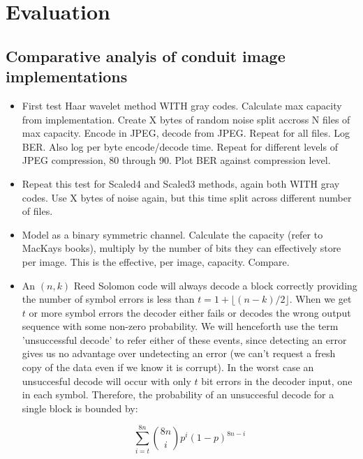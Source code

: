 \chapter{Evaluation}\label{ch:evaluation}

\section{Comparative analyis of conduit image implementations}

\begin{itemize}
\item First test Haar wavelet method WITH gray codes. Calculate max capacity from implementation. Create X bytes of random noise split accross N files of max capacity. Encode in JPEG, decode from JPEG. Repeat for all files. Log BER. Also log per byte encode/decode time. Repeat for different levels of JPEG compression, 80 through 90. Plot BER against compression level.

\item Repeat this test for Scaled4 and Scaled3 methods, again both WITH gray codes. Use X bytes of noise again, but this time split across different number of files.

\item Model as a binary symmetric channel. Calculate the capacity (refer to MacKays books), multiply by the number of bits they can effectively store per image. This is the effective, per image, capacity. Compare.

\item An $(n,k)$ Reed Solomon code will always decode a block correctly providing the number of symbol errors is less than $t = 1 + \lfloor (n-k)/2  \rfloor$. When we get $t$ or more symbol errors the decoder either fails or decodes the wrong output sequence with some non-zero probability. We will henceforth use the term 'unsuccessful decode' to refer either of these events, since detecting an error gives us no advantage over undetecting an error (we can't request a fresh copy of the data even if we know it is corrupt). In the worst case an unsuccesful decode will occur with only $t$ bit errors in the decoder input, one in each symbol. Therefore, the probability of an unsuccesful decode for a single block is bounded by:

\begin{equation}
    \sum_{i=t}^{8n} {{8n}\choose{i}} p^i (1-p)^{8n-i}
\end{equation}


\end{itemize}
